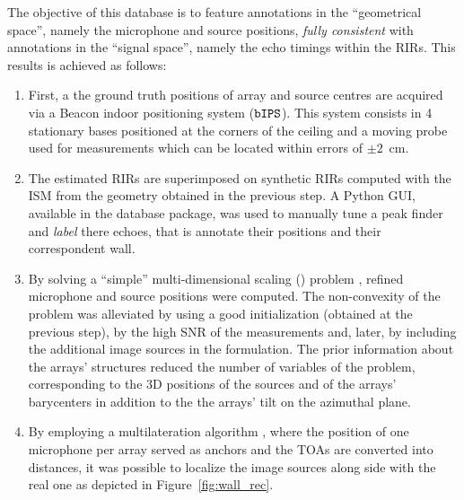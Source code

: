 The objective of this database is to feature annotations in the ``geometrical space'', namely the microphone and source positions, \textit{fully consistent} with annotations in the ``signal space'', namely the echo timings within the RIRs. This results is achieved as follows:
\begin{enumerate}[label=(\roman*)]
\item \label{it:ips} First, a the ground truth positions of array and source centres are acquired via a Beacon indoor positioning system ($\mathtt{bIPS}$). This system consists in 4 stationary bases positioned at the corners of the ceiling and a moving probe used for measurements which can be located within errors of $\pm2$~cm.

\item \label{it:not}  The estimated RIRs are superimposed on synthetic RIRs computed with the ISM from the geometry obtained in the previous step. A Python GUI, available in the database package, was used to manually tune a peak finder and \textit{label} there echoes, that is annotate their positions and their correspondent wall.

\item \label{it:mds} By solving a ``simple'' multi-dimensional scaling (\MDS) problem , refined microphone and source positions were computed. The non-convexity of the problem was alleviated by using a good initialization (obtained at the previous step), by the high SNR of the measurements and, later, by including the additional image sources in the formulation. The prior information about the arrays' structures reduced the number of variables of the problem, corresponding to the 3D positions of the sources and of the arrays' barycenters in addition to the the arrays' tilt on the azimuthal plane.

\item \label{it:lat} By employing a multilateration algorithm  , where the position of one microphone per array served as anchors and the TOAs are converted into distances, it was possible to localize the image sources along side with the real one as depicted in Figure~\ref{fig:wall_rec}.
\end{enumerate}

